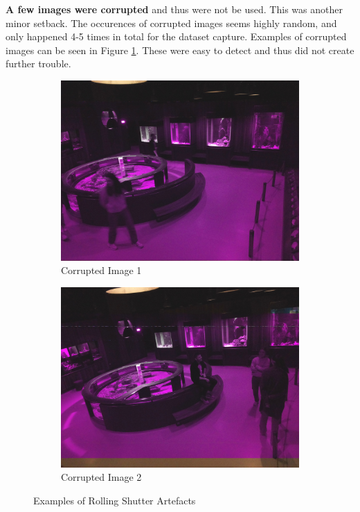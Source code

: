 \textbf{A few images were corrupted} and thus were not be used. This was another minor setback. The occurences of corrupted images seems highly random, and only happened 4-5 times in total for the dataset capture. Examples of corrupted images can be seen in Figure \ref{fig:corrupted_images}. These were easy to detect and thus did not create further trouble.

\begin{figure}[H]
    \centering
    \begin{subfigure}{0.49\textwidth}
        \centering
        \includegraphics[width=\textwidth]{Images/DeviceImages/2nd-iteration/corrupted1.jpg}
        \caption{Corrupted Image 1}
    \end{subfigure}
    \hfill
    \begin{subfigure}{0.49\textwidth}
        \centering
        \includegraphics[width=\textwidth]{Images/DeviceImages/2nd-iteration/corrupted2.jpg}
        \caption{Corrupted Image 2}
    \end{subfigure}
    \caption{Examples of Rolling Shutter Artefacts}
    \label{fig:corrupted_images}
\end{figure}

